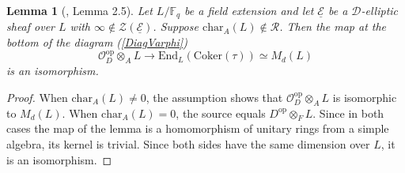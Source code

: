 \documentclass[10pt]{amsart}
\theoremstyle{plain}
\newtheorem{lem}[thm]{Lemma}
\theoremstyle{definition}
\newcommand{\chr}{\mathrm{char}}
\newcommand{\Coker}{\mathrm{Coker}}
\newcommand{\End}{\mathrm{End}}
\newcommand{\id}{\mathrm{id}}
\newcommand{\opp}{\mathrm{op}}
\newcommand{\Spec}{\mathrm{Spec}}
\newcommand{\cE}{\mathcal{E}}
\newcommand{\cO}{\mathcal{O}}
\newcommand{\cR}{\mathcal{R}}
\newcommand{\cZ}{\mathcal{Z}}
\newcommand{\ucE}{\underline{\mathcal{E}}}
\newcommand{\bF}{\mathbb{F}}
\newcommand{\bZ}{\mathbb{Z}}
\newcommand{\sD}{\mathscr{D}}
\begin{document}
\begin{lem}[\cite{Pap}, Lemma 2.5]\label{LemGenCot}
	Let $L/\bF_q$ be a field extension and let $\ucE$ be a $\sD$-elliptic sheaf over $L$ with $\infty\notin \cZ(\ucE)$. Suppose $\chr_A(L)\notin \cR$. 
	Then the map at the bottom of the diagram (\ref{DiagVarphi})
	\[
	\cO_D^\opp\otimes_A L\to \End_{L}(\Coker(\tau))\simeq M_d(L)
	\]
	is an isomorphism.
\end{lem}
\begin{proof}
	When $\chr_A(L)\neq 0$, the assumption shows that $\cO_D^\opp\otimes_A L$ is isomorphic to $M_d(L)$.
	When $\chr_A(L)=0$, the source equals $D^\opp\otimes_F L$.
	Since in both cases the map of the lemma is a homomorphism of unitary rings from a simple algebra, its kernel is trivial. 
	Since both sides have the same dimension over $L$, it is an isomorphism.
\end{proof}

\end{document}
